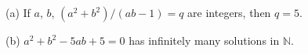 (a) If $a$, $b$, $(a^2 + b^2)/(ab - 1) = q$ are integers, then $q = 5$.

(b) $a^2 + b^2 - 5ab + 5 = 0$ has infinitely many solutions in $\mathbb{N}$.
